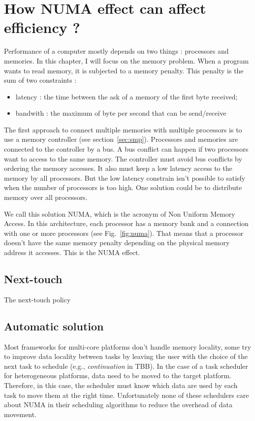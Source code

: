 \section{How NUMA effect can affect efficiency ?}
Performance of a computer mostly depends on two things : processors and memories.
%
In this chapter, I will focus on the memory problem.
%
When a program wants to read memory, it is subjected to a memory penalty.
%
This penalty is the sum of two constraints :
\begin{itemize}
        \item latency : the time between the ask of a memory of the first byte received;
        \item bandwith : the maximum of byte per second that can be send/receive
\end{itemize}

The first approach to connect multiple memories with multiple processors is to use a memory controller (see section~\ref{sec:smp}).
%
Processors and memories are connected to the controller by a bus.
%
A bus conflict can happen if two processors want to access to the same memory.
%
The controller must avoid bus conflicts by ordering the memory accesses.
%
It also must keep a low latency access to the memory by all processors.
%
But the low latency constrain isn't possible to satisfy when the number of processors is too high.
%
One solution could be to distribute memory over all processors.


We call this solution NUMA, which is the acronym of Non Uniform Memory Access.
%
In this architecture, each processor has a memory bank and a connection with one or more processors (see Fig.~\ref{fig:numa}).
%
That means that a processor doesn't have the same memory penalty depending on the physical memory address it accesses.
%
This is the NUMA effect.




\subsection{Next-touch}
The next-touch policy
%


\subsection{Automatic solution}
Most frameworks for multi-core platforms don't handle memory locality, some try to improve data locality between tasks by leaving the user with the choice of the next task to schedule (e.g., {\em continuation} in TBB).
%
In the case of a task scheduler for heterogeneous platforms, data need to be moved to the target platform.
Therefore, in this case, the scheduler must know which data are used by each task to move them at the right time.
%
Unfortunately none of these schedulers care about NUMA in their scheduling algorithms to reduce the overhead of data movement.


